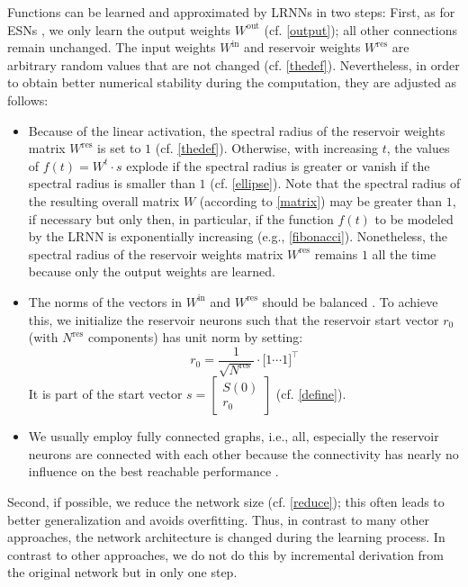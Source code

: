 \documentclass[twoside,11pt]{article}
\theoremstyle{definition}
\begin{document}
Functions can be learned and approximated by LRNNs in two steps: First, as for
ESNs \citep{JH04}, we only learn the output weights $W^\mathrm{out}$ (cf.
\cref{output}); all other connections remain unchanged. The input weights
$W^\mathrm{in}$ and reservoir weights $W^\mathrm{res}$ are arbitrary random
values that are not changed (cf. \cref{thedef}). Nevertheless, in order to
obtain better numerical stability during the computation, they are adjusted as
follows:
\begin{itemize}
  \item Because of the linear activation, the spectral radius of the reservoir
	weights matrix $W^\mathrm{res}$ is set to $1$ (cf. \cref{thedef}).
	Otherwise, with increasing $t$, the values of $f(t) = W^t \cdot s$
	explode if the spectral radius is greater or vanish if the spectral
	radius is smaller than $1$ (cf. \cref{ellipse}). Note that the spectral
	radius of the resulting overall matrix $W$ (according to \cref{matrix})
	may be greater than $1$, if necessary but only then, in particular, if
	the function $f(t)$ to be modeled by the LRNN is exponentially
	increasing (e.g., \cref{fibonacci}). Nonetheless, the spectral radius of
	the reservoir weights matrix $W^\mathrm{res}$ remains $1$ all the time
	because only the output weights are learned.
  \item The norms of the vectors in $W^\mathrm{in}$ and $W^\mathrm{res}$ should
        be balanced \citep{KLB12}. To achieve this, we initialize the reservoir
        neurons such that the reservoir start vector $r_0$ (with $N^\mathrm{res}$
        components) has unit norm by
        setting:
	\[ r_0 = \frac{1}{\sqrt{N^\mathrm{res}}} \cdot \big[ 1 \cdots 1 \big]^\top \]
	It is part of the start vector $s = \left[ \begin{array}{c} S(0) \\ r_0
	\end{array} \right]$ (cf. \cref{define}).
  \item We usually employ fully connected graphs, i.e., all, especially the
	reservoir neurons are connected with each other because the
	connectivity has nearly no influence on the best reachable performance
	\citep{KLB12}.
\end{itemize}
Second, if possible, we reduce the network size (cf. \cref{reduce});
this often leads to better generalization and avoids overfitting. Thus, in
contrast to many other approaches, the network architecture is changed during
the learning process. In contrast to other approaches, we do not do this by
incremental derivation from the original network but in only one step.
\end{document}
